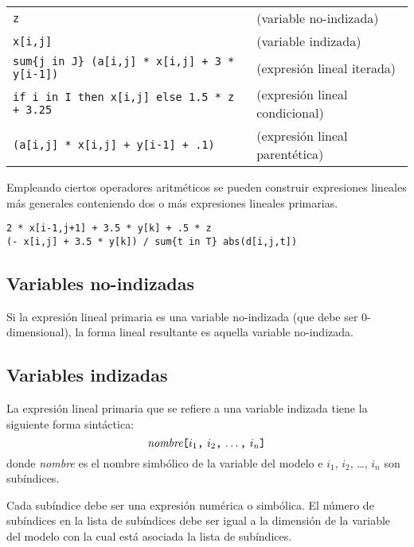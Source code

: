 \documentclass[11pt,spanish]{report}
\def\para#1{\noindent{\bf#1}}
\begin{document}
\para{Ejemplos}

\noindent
\begin{tabular}{@{}ll@{}}
\verb|z| &(variable no-indizada)\\
\verb|x[i,j]| &(variable indizada)\\
\verb|sum{j in J} (a[i,j] * x[i,j] + 3 * y[i-1])| &
(expresión lineal iterada)\\
\verb|if i in I then x[i,j] else 1.5 * z + 3.25| &
(expresión lineal condicional)\\
\verb|(a[i,j] * x[i,j] + y[i-1] + .1)| &
(expresión lineal parentética)\\
\end{tabular}

Empleando ciertos operadores aritméticos se pueden construir expresiones lineales más generales conteniendo dos o más expresiones lineales primarias.

\para{Ejemplos}

\begin{verbatim}
2 * x[i-1,j+1] + 3.5 * y[k] + .5 * z
(- x[i,j] + 3.5 * y[k]) / sum{t in T} abs(d[i,j,t])
\end{verbatim}

\vspace*{-5pt}

\subsection{Variables no-indizadas}

Si la expresión lineal primaria es una variable no-indizada (que debe ser 0-dimensional), la forma lineal resultante es aquella variable no-indizada.

\vspace*{-5pt}

\subsection{Variables indizadas}

La expresión lineal primaria que se refiere a una variable indizada tiene la siguiente forma sintáctica:
$$\mbox{{\it nombre}{\tt[}$i_1${\tt,} $i_2${\tt,} \dots{\tt,}
$i_n${\tt]}}$$
donde {\it nombre} es el nombre simbólico de la variable del modelo e $i_1$,
$i_2$, \dots, $i_n$ son subíndices.

Cada subíndice debe ser una expresión numérica o simbólica. El número de subíndices en la lista de subíndices debe ser igual a la dimensión de la variable del modelo con la cual está asociada la lista de subíndices.
\end{document}

